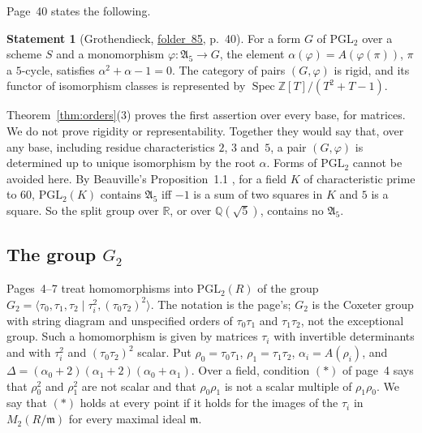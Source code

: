 \documentclass[11pt,a4paper]{amsart}
\theoremstyle{definition}
\newtheorem{statement}[theorem]{Statement}
\theoremstyle{remark}
\newcommand{\Z}{\mathbb Z}
\newcommand{\Q}{\mathbb Q}
\newcommand{\PGL}{\mathrm{PGL}_2}
\newcommand{\fac}[1]{\href{https://grothendieck.umontpellier.fr/#1.pdf}{folder~#1}}
\begin{document}
Page~40 states the following.

\begin{statement}[Grothendieck, \fac{85}, p.~40]\label{st:a5}
For a form $G$ of $\PGL$ over a scheme $S$ and a monomorphism $\varphi\colon\mathfrak A_5 \to G$, the element $\alpha(\varphi) = A(\varphi(\pi))$, $\pi$ a $5$-cycle, satisfies $\alpha^2 + \alpha - 1 = 0$. The category of pairs $(G, \varphi)$ is rigid, and its functor of isomorphism classes is represented by $\operatorname{Spec}\Z[T]/(T^2 + T - 1)$.
\end{statement}

Theorem~\ref{thm:orders}(3) proves the first assertion over every base, for matrices. We do not prove rigidity or representability. Together they would say that, over any base, including residue characteristics $2$, $3$ and~$5$, a pair $(G, \varphi)$ is determined up to unique isomorphism by the root $\alpha$. Forms of $\PGL$ cannot be avoided here. By Beauville's Proposition~1.1 \cite{beauville2010}, for a field $K$ of characteristic prime to $60$, $\PGL(K)$ contains $\mathfrak A_5$ iff $-1$ is a sum of two squares in $K$ and $5$ is a square. So the split group over $\mathbb R$, or over $\Q(\sqrt 5)$, contains no $\mathfrak A_5$.

\subsection*{The group $G_2$}
Pages~4--7 treat homomorphisms into $\PGL(R)$ of the group $G_2 = \langle\tau_0, \tau_1, \tau_2 \mid \tau_i^2, (\tau_0\tau_2)^2\rangle$. The notation is the page's; $G_2$ is the Coxeter group with string diagram and unspecified orders of $\tau_0\tau_1$ and $\tau_1\tau_2$, not the exceptional group. Such a homomorphism is given by matrices $\tau_i$ with invertible determinants and with $\tau_i^2$ and $(\tau_0\tau_2)^2$ scalar. Put $\rho_0 = \tau_0\tau_1$, $\rho_1 = \tau_1\tau_2$, $\alpha_i = A(\rho_i)$, and $\Delta = (\alpha_0 + 2)(\alpha_1 + 2)(\alpha_0 + \alpha_1)$. Over a field, condition $(*)$ of page~4 says that $\rho_0^2$ and $\rho_1^2$ are not scalar and that $\rho_0\rho_1$ is not a scalar multiple of $\rho_1\rho_0$. We say that $(*)$ holds at every point if it holds for the images of the $\tau_i$ in $M_2(R/\mathfrak m)$ for every maximal ideal $\mathfrak m$.
\end{document}

